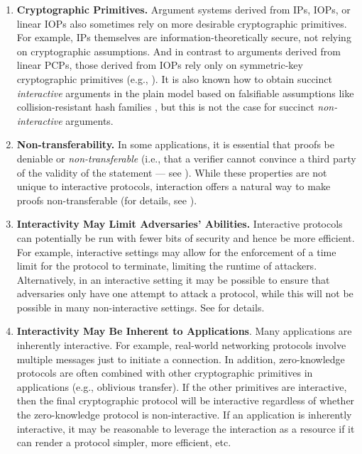 \begin{enumerate}[label=\arabic*.]
\item \textbf{Cryptographic Primitives.} 
Argument systems derived from IPs, IOPs, or linear IOPs also sometimes rely on more desirable cryptographic primitives. For example, IPs themselves are information-theoretically secure, not relying on cryptographic assumptions. 
And in contrast to arguments derived from linear PCPs, those derived from IOPs rely only on symmetric-key cryptographic primitives (e.g., \cite{2016:BCS:tcc:IOPs}).
It is also known how to obtain succinct \emph{interactive} arguments in the plain model based on falsifiable assumptions like collision-resistant hash families \cite{1995:crypto:Improved-Efficient-Arguments}, but this is not the case for succinct \emph{non-interactive} arguments.

\item \textbf{Non-transferability.} 
In some applications, it is essential that proofs be deniable or \emph{non-transferable} (i.e., that a verifier cannot convince a third party of the validity of the statement --- see ). 
While these properties are not unique to interactive protocols, interaction offers a natural way to make proofs non-transferable (for details, see  ).


\item  \textbf{Interactivity May Limit Adversaries' Abilities.}  
Interactive protocols can potentially be run with fewer bits of security and hence be more efficient. 
For example, interactive settings may allow for the enforcement of a time limit for the protocol to terminate, limiting the runtime of attackers. 
Alternatively, in an interactive setting it may be possible to ensure that adversaries only have one attempt to attack a protocol, while this will not be possible in many non-interactive settings. 
See  for details.


\item \textbf{Interactivity May Be Inherent to Applications}. 
Many applications are inherently interactive. For example, real-world networking protocols involve multiple messages just to initiate a connection.
In addition, zero-knowledge protocols are often combined with other cryptographic primitives in applications (e.g., oblivious transfer).
If the other primitives are interactive, then the final cryptographic protocol will be interactive regardless of whether the zero-knowledge protocol is non-interactive.
If an application is inherently interactive, it may be reasonable to leverage the interaction as a resource if it can render a protocol simpler, more efficient, etc. 

\end{enumerate}



